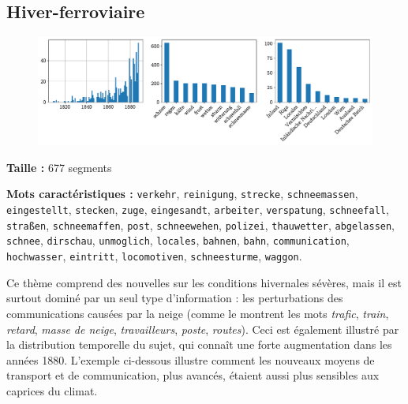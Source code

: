 \documentclass[a4paper,twoside,12pt]{article}
\begin{document}
\clearpage


\subsection{Hiver-ferroviaire} \label{topic8_hiver-ferroviaire}

\begin{figure}[H]
\centering
\includegraphics[width=\textwidth]{images/topic_charts_8.pdf}
\end{figure}

\begin{flushleft}
\textbf{Taille :} 677 segments

\textbf{Mots caractéristiques :} \texttt{verkehr}, \texttt{reinigung}, \texttt{strecke}, \texttt{schneemassen}, \texttt{eingestellt}, \texttt{stecken}, \texttt{zuge}, \texttt{eingesandt}, \texttt{arbeiter}, \texttt{verspatung}, \texttt{schneefall}, \texttt{straßen}, \texttt{schneemaffen}, \texttt{post}, \texttt{schneewehen}, \texttt{polizei}, \texttt{thauwetter}, \texttt{abgelassen}, \texttt{schnee}, \texttt{dirschau}, \texttt{unmoglich}, \texttt{locales}, \texttt{bahnen}, \texttt{bahn}, \texttt{communication}, \texttt{hochwasser}, \texttt{eintritt}, \texttt{locomotiven}, \texttt{schneesturme}, \texttt{waggon}.
\end{flushleft}

\noindent Ce thème comprend des nouvelles sur les conditions hivernales sévères, mais il est surtout dominé par un seul type d'information : les perturbations des communications causées par la neige (comme le montrent les mots \textit{trafic}, \textit{train}, \textit{retard}, \textit{masse de neige}, \textit{travailleurs}, \textit{poste}, \textit{routes}). Ceci est également illustré par la distribution temporelle du sujet, qui connaît une forte augmentation dans les années 1880. L'exemple ci-dessous illustre comment les nouveaux moyens de transport et de communication, plus avancés, étaient aussi plus sensibles aux caprices du climat.

\medskip
\end{document}
